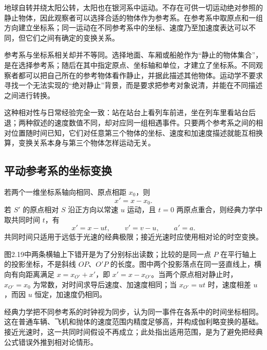 
地球自转并绕太阳公转，太阳也在银河系中运动。不存在可供一切运动绝对参照的静止物体，因此观察者可以选择合适的物体作为参考系。在参考系中取原点和一组方向建立坐标系；同一运动在不同参考系中的坐标、速度乃至加速度表达可以不同，但它们之间有确定的变换关系。

参考系与坐标系相关却并不等同。选择地面、车厢或船舱作为“静止的物体集合”，是在选择参考系；随后在其中指定原点、坐标轴和单位，才建立了坐标系。不同观察者都可以把自己所在的参考物体看作静止，并据此描述其他物体。运动学不要求寻找一个无法实现的“绝对静止”背景，而是要求把参考对象说清，并能在不同描述之间进行转换。

这种相对性与日常经验完全一致：站在站台上看列车前进，坐在列车里看站台后退；两种叙述的速度数值不同，却对应同一组相遇事件。只要两个参考系之间的相对位置随时间已知，它们对任意第三个物体的坐标、速度和加速度描述就能互相换算，变换关系本身与第三个物体怎样运动无关。

\subsection*{平动参考系的坐标变换}

\ReferenceFramesDiagram

若两个一维坐标系轴向相同、原点相距 $x_0$，则
\begin{equation}
x'=x-x_0.
\end{equation}
若 $S'$ 的原点相对 $S$ 沿正方向以常速 $u$ 运动，且 $t=0$ 两原点重合，则经典力学中取共同时间 $t$，有
\begin{equation}
x'=x-ut,\qquad v'=v-u,\qquad a'=a.
\end{equation}
共同时间只适用于远低于光速的经典极限；接近光速时应使用相对论的时空变换。

图2.19中两条横轴上下错开是为了分别标出读数；比较的是同一点 $P$ 在平行轴上的投影坐标，不是斜线 $OP$、$O'P$ 的长度。图中两个投影落点在同一竖直线上，横向有向距离满足 $x=x_{O'}+x'$，即 $x'=x-x_{O'}$。当两个原点相对静止时，$x_{O'}=x_0$ 为常数，对时间求导后速度、加速度相同；当 $x_{O'}=ut$ 时，速度相差 $u$，而因 $u$ 恒定，加速度仍相同。

经典力学把不同参考系的时钟视为同步，认为同一事件在各系中的时间坐标相同。这在普通车辆、飞机和抛体的速度范围内精度足够高，并构成伽利略变换的基础。接近光速时，这一共同时间假设不再成立；此处指出适用范围，是为了避免把经典公式错误外推到相对论情形。

